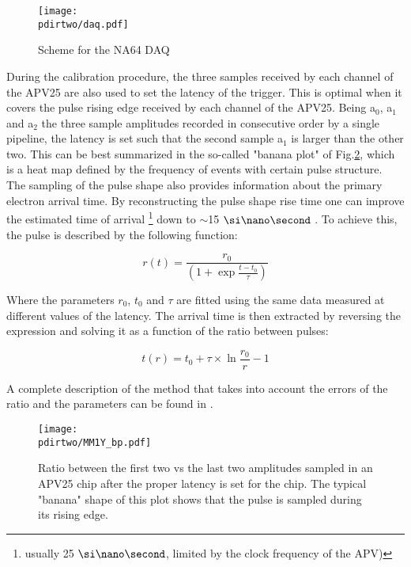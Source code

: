 \begin{figure}[tbh!]
\centering
\texttt{[image: \\pdirtwo/daq.pdf]}
\caption{Scheme for the NA64 DAQ}
\label{fig:daq}
\end{figure}

During the calibration procedure, the three samples received by each channel of the APV25 are also used to set the latency of the trigger. This is optimal when it covers the pulse rising edge received by each channel of the APV25. Being a$_0$, a$_1$ and a$_2$ the three sample amplitudes recorded in consecutive order by a single pipeline, the latency is set such that the second sample a$_1$ is larger than the other two. This can be best summarized in the so-called "banana plot" of Fig.\ref{fig:banana-plot}, which is a heat map defined by the frequency of events with certain pulse structure. The sampling of the pulse shape also provides information about the primary electron arrival time. By reconstructing the pulse shape rise time one can improve the estimated time of arrival \footnote{usually 25 $\nas$, limited by the clock frequency of the APV)} down to $\sim$15 $\nas$ \cite{Banerjee:2017mdu}. To achieve this, the pulse is described by the following function:

\begin{equation}
\label{eq:apv-pulse}
r(t) = \frac{r_0}{(1 + \exp{\frac{t-t_0}{\tau}})}
\end{equation}

Where the parameters $r_0$, $t_0$ and $\tau$ are fitted using the same data measured at different values of the latency. The arrival time is then extracted by reversing the expression and solving it as a function of the ratio between pulses:

\begin{equation}
\label{eq:2}
t(r) = t_0 + \tau \times \ln{\frac{r_0}{r} - 1}
\end{equation}

A complete description of the method that takes into account the errors of the ratio and the parameters can be found in \cite{dbanerjee-thesis}.

\begin{figure}[!bth]
  \centering
  \texttt{[image: \\pdirtwo/MM1Y\_bp.pdf]}
\caption[APV25 banana plot]{Ratio between the first two vs the last two amplitudes sampled in an APV25 chip after the proper latency is set for the chip. The typical "banana" shape of this plot shows that the pulse is sampled during its rising edge.}
\label{fig:banana-plot}
\end{figure}

